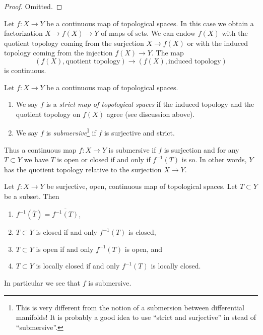 \begin{proof}
Omitted.
\end{proof}

\noindent
Let $f : X \to Y$ be a continuous map of topological spaces.
In this case we obtain a factorization $X \to f(X) \to Y$
of maps of sets. We can endow $f(X)$ with the
quotient topology coming from the surjection $X \to f(X)$
or with the induced topology coming from the injection $f(X) \to Y$.
The map
$$
(f(X), \text{quotient topology})
\longrightarrow
(f(X), \text{induced topology})
$$
is continuous.

\begin{definition}
\label{definition-submersive}
Let $f : X \to Y$ be a continuous map of topological spaces.
\begin{enumerate}
\item We say $f$ is a {\it strict map of topological spaces}
if the induced topology and the quotient topology on $f(X)$ agree
(see discussion above).
\item We say $f$ is {\it submersive}\footnote{This is very different from
the notion of a submersion between differential manifolds! It is probably
a good idea to use ``strict and surjective'' in stead of ``submersive''.}
if $f$ is surjective and strict.
\end{enumerate}
\end{definition}

\noindent
Thus a continuous map $f : X \to Y$ is submersive if $f$
is surjection and for any $T \subset Y$ we have
$T$ is open or closed if and only if $f^{-1}(T)$ is so.
In other words, $Y$ has the
quotient topology relative to the surjection $X \to Y$.

\begin{lemma}
\label{lemma-open-morphism-quotient-topology}
Let $f : X \to Y$ be surjective, open, continuous map of topological spaces.
Let $T \subset Y$ be a subset. Then
\begin{enumerate}
\item $f^{-1}(\overline{T}) = \overline{f^{-1}(T)}$,
\item $T \subset Y$ is closed if and only $f^{-1}(T)$ is closed,
\item $T \subset Y$ is open if and only $f^{-1}(T)$ is open, and
\item $T \subset Y$ is locally closed if and only $f^{-1}(T)$ is locally closed.
\end{enumerate}
In particular we see that $f$ is submersive.
\end{lemma}

